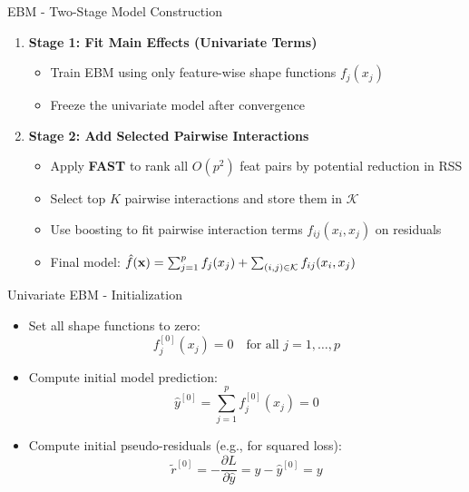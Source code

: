 \documentclass[10pt,compress,t,notes=noshow, xcolor=table]{beamer}
\begin{document}
\begin{frame}{EBM - Two-Stage Model Construction}
\begin{enumerate}
    \item \textbf{Stage 1: Fit Main Effects (Univariate Terms) %
}
    \begin{itemize}
        \item Train EBM using only feature-wise shape functions $f_j(x_j)$
        \item Freeze the univariate model after convergence
    \end{itemize}
    
    \item \textbf{Stage 2: Add Selected Pairwise Interactions %
}
    \begin{itemize}
        \item Apply \textbf{FAST} to rank all $O(p^2)$ feat pairs by potential reduction in RSS
        \item Select top $K$ pairwise interactions and store them in $\mathcal{K}$
        \item Use boosting to fit pairwise interaction terms $f_{ij}(x_i, x_j)$ on residuals
        \item Final model: $\hat{f}(\mathbf{x}) = \sum_{j=1}^p f_j(x_j) + \sum_{(i,j)\in\mathcal{K}} f_{ij}(x_i, x_j)$
    \end{itemize}
\end{enumerate}

\end{frame}



\begin{frame}{Univariate EBM - Initialization}

\begin{itemize}
    \item Set all shape functions to zero:
    $$
    f_j^{[0]}(x_j) = 0 \quad \text{for all } j = 1, \dots, p
    $$
    \item Compute initial model prediction:
    $$
    \hat{y}^{[0]} = \sum_{j=1}^p f_j^{[0]}(x_j) = 0
    $$
    \item Compute initial pseudo-residuals (e.g., for squared loss):
    $$
    \tilde{r}^{[0]} = -\frac{\partial L}{\partial \hat{y}} = y - \hat{y}^{[0]} = y
    $$
\end{itemize}

\end{frame}
\end{document}

